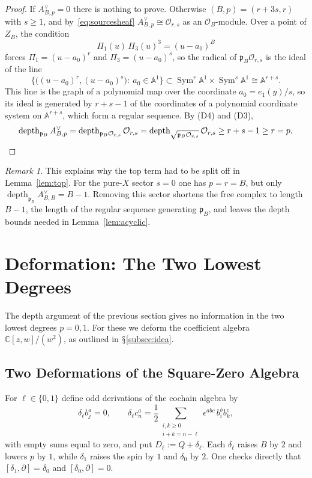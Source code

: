 \documentclass[11pt]{amsart}
\numberwithin{equation}{section}
\renewcommand{\S}{\mbox{$\mathsection$}}
\theoremstyle{definition}
\theoremstyle{remark}
\newtheorem{remark}[theorem]{Remark}
\newcommand{\C}{\mathbb{C}}
\newcommand{\A}{\mathbb{A}}
\newcommand{\pp}{\mathfrak{p}}
\newcommand{\dd}{\partial}
\newcommand{\cO}{\mathcal{O}}
\newcommand{\Sym}{\operatorname{Sym}}
\newcommand{\depth}{\operatorname{depth}}
\begin{document}
\begin{proof}
If $A^\vee_{B,p}=0$ there is nothing to prove. Otherwise $(B,p)=(r+3s,r)$ with $s\ge1$, and by~\eqref{eq:sourcesheaf} $A^\vee_{B,p}\cong\cO_{r,s}$ as an $\cO_B$-module. Over a point of $Z_B$, the condition
\begin{equation}\label{eq:collision-condition}
\Pi_1(u)\,\Pi_3(u)^3=(u-a_0)^B
\end{equation}
forces $\Pi_1=(u-a_0)^r$ and $\Pi_3=(u-a_0)^s$, so the radical of $\pp_B\cO_{r,s}$ is the ideal of the line
\begin{equation}\label{eq:collision-line}
\bigl\{\bigl((u-a_0)^r,(u-a_0)^s\bigr):\ a_0\in\A^1\bigr\}\subset\Sym^r\A^1\times\Sym^s\A^1\cong\A^{r+s}.
\end{equation}
This line is the graph of a polynomial map over the coordinate $a_0=e_1(y)/s$, so its ideal is generated by $r+s-1$ of the coordinates of a polynomial coordinate system on $\A^{r+s}$, which form a regular sequence. By (D4) and (D3),
\begin{equation}\label{eq:source-depth}
\depth_{\pp_B}A^\vee_{B,p}=\depth_{\pp_B\cO_{r,s}}\cO_{r,s}=\depth_{\sqrt{\pp_B\cO_{r,s}}}\cO_{r,s}\ge r+s-1\ge r=p. \qedhere
\end{equation}
\end{proof}

\begin{remark}\label{rem:top}
This explains why the top term had to be split off in Lemma~\ref{lem:top}. For the pure-$X$ sector $s=0$ one has $p=r=B$, but only $\depth_{\pp_B}A^\vee_{B,B}=B-1$. Removing this sector shortens the free complex to length $B-1$, the length of the regular sequence generating $\pp_B$, and leaves the depth bounds needed in Lemma~\ref{lem:acyclic}.
\end{remark}

\section{Deformation: The Two Lowest Degrees}\label{sec:deformation}

The depth argument of the previous section gives no information in the two lowest degrees $p=0,1$. For these we deform the coefficient algebra $\C[z,w]/(w^2)$, as outlined in \S\ref{subsec:idea}.

\subsection{Two Deformations of the Square-Zero Algebra}
For $\ell\in\{0,1\}$ define odd derivations of the cochain algebra by
\begin{equation}\label{eq:deltas}
\delta_\ell b_j^a=0,\qquad \delta_\ell c_n^a=\frac12\sum_{\substack{i,k\ge0\\ i+k=n-\ell}}\epsilon^{abc}\,b_i^bb_k^c,
\end{equation}
with empty sums equal to zero, and put $D_\ell:=Q+\delta_\ell$. Each $\delta_\ell$ raises $B$ by $2$ and lowers $p$ by $1$, while $\delta_1$ raises the spin by $1$ and $\delta_0$ by $2$. One checks directly that $[\delta_1,\dd]=\delta_0$ and $[\delta_0,\dd]=0$.
\end{document}

